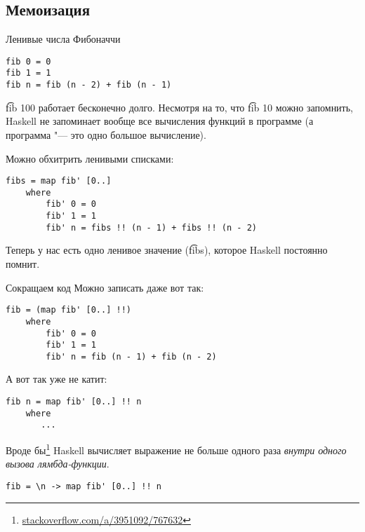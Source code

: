 \subsection{Мемоизация}

\begin{frame}
\end{frame}

\begin{frame}[t,fragile]{Ленивые числа Фибоначчи}
\begin{verbatim}
fib 0 = 0
fib 1 = 1
fib n = fib (n - 2) + fib (n - 1)
\end{verbatim}
	\t{fib 100} работает бесконечно долго.
	Несмотря на то, что \t{fib 10} можно запомнить,
	Haskell не запоминает вообще все вычисления функций в программе
	(а программа "--- это одно большое вычисление).

	Можно обхитрить ленивыми списками:
\begin{verbatim}
fibs = map fib' [0..]
    where
        fib' 0 = 0
        fib' 1 = 1
        fib' n = fibs !! (n - 1) + fibs !! (n - 2)
\end{verbatim}
	Теперь у нас есть одно ленивое значение (\t{fibs}), которое Haskell
	постоянно помнит.
\end{frame}

\begin{frame}[t,fragile]{Сокращаем код}
	Можно записать даже вот так:
\begin{verbatim}
fib = (map fib' [0..] !!)
    where
        fib' 0 = 0
        fib' 1 = 1
        fib' n = fib (n - 1) + fib (n - 2)
\end{verbatim}

	А вот так уже не катит:
\begin{verbatim}
fib n = map fib' [0..] !! n
    where
       ...
\end{verbatim}
	
	Вроде бы\footnote{\href{https://stackoverflow.com/a/3951092/767632}{stackoverflow.com/a/3951092/767632}}
	Haskell вычисляет выражение не больше одного раза \textit{внутри одного вызова лямбда-функции}.
\begin{verbatim}
fib = \n -> map fib' [0..] !! n
\end{verbatim}
\end{frame}
